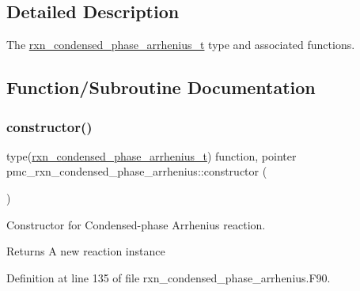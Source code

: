 \subsection{Detailed Description}
The \mbox{\hyperlink{structpmc__rxn__condensed__phase__arrhenius_1_1rxn__condensed__phase__arrhenius__t}{rxn\+\_\+condensed\+\_\+phase\+\_\+arrhenius\+\_\+t}} type and associated functions. 

\subsection{Function/\+Subroutine Documentation}
\mbox{\label{namespacepmc__rxn__condensed__phase__arrhenius_a86fca966cbac239128e1c8182d9435ac}} 
\subsubsection{\texorpdfstring{constructor()}{constructor()}}
{\footnotesize\ttfamily type(\mbox{\hyperlink{structpmc__rxn__condensed__phase__arrhenius_1_1rxn__condensed__phase__arrhenius__t}{rxn\+\_\+condensed\+\_\+phase\+\_\+arrhenius\+\_\+t}}) function, pointer pmc\+\_\+rxn\+\_\+condensed\+\_\+phase\+\_\+arrhenius\+::constructor (\begin{DoxyParamCaption}{ }\end{DoxyParamCaption})\hspace{0.3cm}{\ttfamily [private]}}



Constructor for Condensed-\/phase Arrhenius reaction. 

\begin{DoxyReturn}{Returns}
A new reaction instance 
\end{DoxyReturn}


Definition at line 135 of file rxn\+\_\+condensed\+\_\+phase\+\_\+arrhenius.\+F90.

\mbox{\label{namespacepmc__rxn__condensed__phase__arrhenius_a8a116287a43f4018bb5896f88b55d0d6}} 
